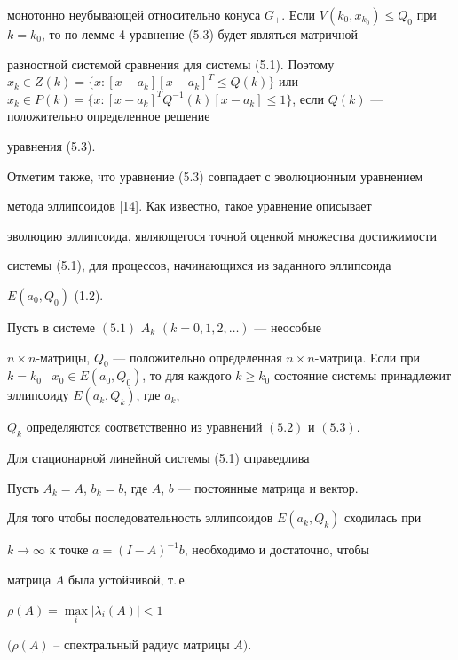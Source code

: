 монотонно неубывающей относительно конуса $G_+$. Если $V(k_0,x_{k_0})\le


Q_0$ при $k=k_0$, то по лемме 4 уравнение (5.3) будет являться матричной


разностной системой сравнения для системы (5.1). Поэтому $x_k\in


Z(k)=\{x:[x-a_k][x-a_k]^T\le Q(k)\}$ или $x_k\in P(k)=\{x:[x-a_k]^T


Q^{-1}(k)[x-a_k]\le1\}$, если $Q(k)$ --- положительно определенное решение


уравнения (5.3).





Отметим также, что уравнение (5.3) совпадает с эволюционным уравнением


метода эллипсоидов [14]. Как известно, такое уравнение описывает


эволюцию эллипсоида, являющегося точной оценкой множества достижимости


системы (5.1), для процессов, начинающихся из заданного эллипсоида


$E(a_0,Q_0)$ (1.2).





\begin{lem}


Пусть в системе $(5.1)$ $A_k$ $(k=0,1,2,\dotsc)$ --- неособые


$n\times n$-матрицы, $Q_0$ --- положительно определенная $n\times


n$-матрица. Если при $k=k_0$ \ $x_0\in E(a_0,Q_0)$, то для каждого $k\ge


k_0$ состояние системы принадлежит эллипсоиду $E(a_k,Q_k)$, где $a_k$,


$Q_k$ определяются соответственно из уравнений $(5.2)$ и $(5.3)$.


\end{lem}





Для стационарной линейной системы (5.1) справедлива





\begin{lem}


Пусть $A_k=A$, $b_k=b$, где $A$, $b$ --- постоянные матрица и вектор.


Для того чтобы последовательность эллипсоидов $E(a_k,Q_k)$ сходилась при


$k\to\infty$ к точке $a=(I-A)^{-1}b$, необходимо и достаточно, чтобы


матрица $A$ была устойчивой, т.\,е.


$\rho(A)=\max\limits_i|\lambda_i(A)|<1$


$(\rho(A)$ -- спектральный радиус матрицы $A)$.


\end{lem}









